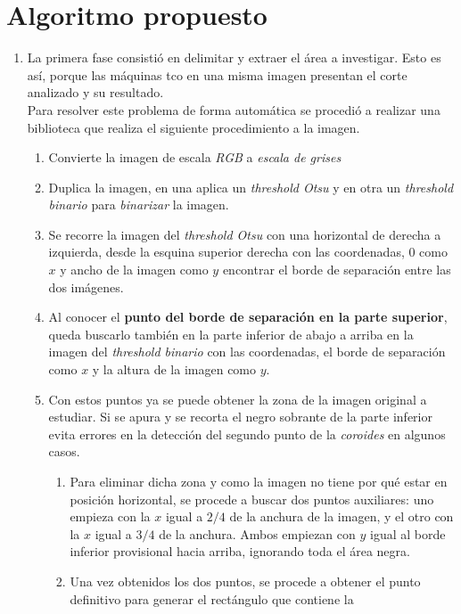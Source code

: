 \section{Algoritmo propuesto}
\begin{enumerate}
\item La primera fase consistió en delimitar y extraer el área a
  investigar. Esto es así, porque las máquinas \gls{tco} en una misma
  imagen presentan el corte analizado y su resultado.\\
  Para resolver este problema de forma automática se procedió a
  realizar una biblioteca que realiza el siguiente procedimiento a la
  imagen.
  \begin{enumerate}[label*=\arabic*.]
  \item Convierte la imagen de escala \emph{RGB} a \emph{escala de
      grises}
  \item Duplica la imagen, en una aplica un \emph{threshold Otsu} y en
    otra un \emph{threshold binario} para \emph{binarizar} la imagen.
  \item Se recorre la imagen del \emph{threshold Otsu} con una
    horizontal de derecha a izquierda, desde la esquina superior
    derecha con las coordenadas, 0 como $x$ y ancho de la imagen como
    $y$ encontrar el borde de separación entre las dos imágenes.
  \item Al conocer el  \textbf{punto del borde de separación en la parte
    superior}, queda buscarlo también en la parte inferior de abajo a arriba en la
    imagen del \emph{threshold binario} con las coordenadas, el borde
    de separación como $x$ y la altura de la imagen como $y$.
  \item Con estos puntos ya se puede obtener la zona de la imagen
    original a estudiar. Si se apura y se recorta el negro sobrante de
    la parte inferior evita errores en la detección del segundo punto
    de la \emph{coroides} en algunos casos.
    \begin{enumerate}[label*=\arabic*.]
    \item Para eliminar dicha zona y como la imagen no tiene por qué
      estar en posición horizontal, se procede a buscar dos puntos
      auxiliares: uno empieza con la $x$ igual a $2/4$ de la anchura
      de la imagen, y el otro con la $x$ igual a $3/4$ de la
      anchura. Ambos empiezan con $y$ igual al borde inferior
      provisional hacia arriba, ignorando toda el área negra.
    \item Una vez obtenidos los dos puntos, se procede a obtener el
      punto definitivo para generar el rectángulo que contiene la

\end{enumerate}
\end{enumerate}
\end{enumerate}
